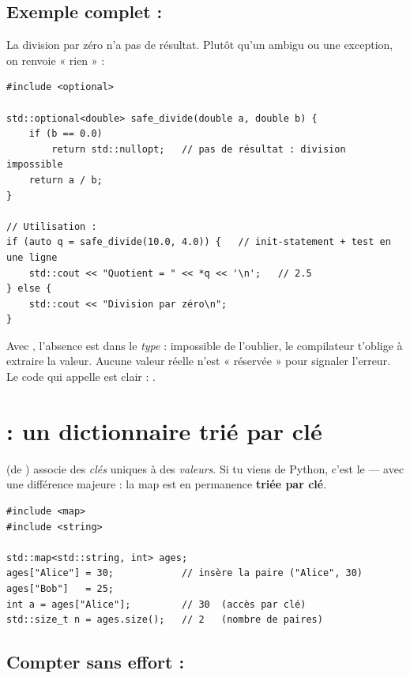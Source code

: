 \documentclass[11pt]{article}
\begin{document}
\subsection*{Exemple complet : }

La division par zéro n'a pas de résultat. Plutôt qu'un  ambigu ou une
exception, on renvoie « rien » :

\begin{lstlisting}
#include <optional>

std::optional<double> safe_divide(double a, double b) {
    if (b == 0.0)
        return std::nullopt;   // pas de résultat : division impossible
    return a / b;
}

// Utilisation :
if (auto q = safe_divide(10.0, 4.0)) {   // init-statement + test en une ligne
    std::cout << "Quotient = " << *q << '\n';   // 2.5
} else {
    std::cout << "Division par zéro\n";
}
\end{lstlisting}

\begin{aretenir}
Avec , l'absence est dans le \emph{type} : impossible de
l'oublier, le compilateur t'oblige à extraire la valeur. Aucune valeur réelle
n'est « réservée » pour signaler l'erreur. Le code qui appelle est clair :
.
\end{aretenir}

\section{ : un dictionnaire trié par clé}

 (de ) associe des \emph{clés} uniques à
des \emph{valeurs}. Si tu viens de Python, c'est le  — avec une
différence majeure : la map est en permanence \textbf{triée par clé}.

\begin{lstlisting}
#include <map>
#include <string>

std::map<std::string, int> ages;
ages["Alice"] = 30;            // insère la paire ("Alice", 30)
ages["Bob"]   = 25;
int a = ages["Alice"];         // 30  (accès par clé)
std::size_t n = ages.size();   // 2   (nombre de paires)
\end{lstlisting}

\subsection*{Compter sans effort : }
\end{document}
